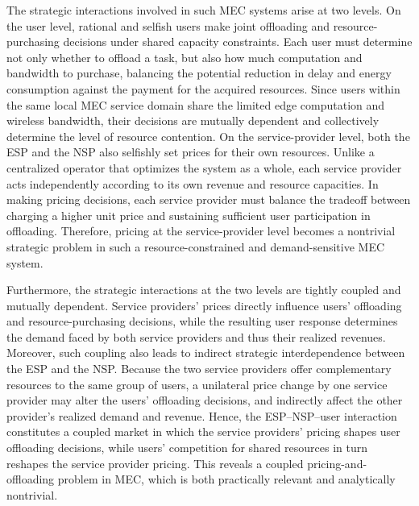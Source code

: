 \documentclass[lettersize,journal]{IEEEtran}
\begin{document}
The strategic interactions involved in such MEC systems arise at two levels. On the user level, rational and selfish users make joint offloading and resource-purchasing decisions under shared capacity constraints. Each user must determine not only whether to offload a task, but also how much computation and bandwidth to purchase, balancing the potential reduction in delay and energy consumption against the payment for the acquired resources. Since users within the same local MEC service domain share the limited edge computation and wireless bandwidth, their decisions are mutually dependent and collectively determine the level of resource contention. On the service-provider level, both the ESP and the NSP also selfishly set prices for their own resources. Unlike a centralized operator that optimizes the system as a whole, each service provider acts independently according to its own revenue and resource capacities. In making pricing decisions, each service provider must balance the tradeoff between charging a higher unit price and sustaining sufficient user participation in offloading. Therefore, pricing at the service-provider level becomes a nontrivial strategic problem in such a resource-constrained and demand-sensitive MEC system.

Furthermore, the strategic interactions at the two levels are tightly coupled and mutually dependent. Service providers’ prices directly influence users’ offloading and resource-purchasing decisions, while the resulting user response determines the demand faced by both service providers and thus their realized revenues. Moreover, such coupling also leads to indirect strategic interdependence between the ESP and the NSP. Because the two service providers offer complementary resources to the same group of users, a unilateral price change by one service provider may alter the users' offloading decisions, and indirectly affect the other provider’s realized demand and revenue.
Hence, the ESP--NSP--user interaction constitutes a coupled market in which the service providers' pricing shapes user offloading decisions, while users' competition for shared resources in turn reshapes the service provider pricing.
This reveals a coupled pricing-and-offloading problem in MEC, which is both practically relevant and analytically nontrivial.
\end{document}
